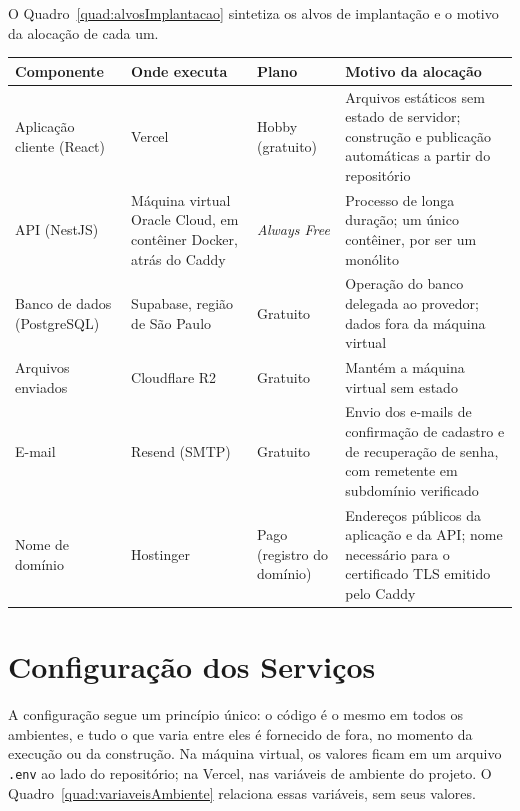 O Quadro~\ref{quad:alvosImplantacao} sintetiza os alvos de implantação e o motivo da alocação de cada um.

\FloatBarrier
\begin{quadro}[h!]
\caption{Alvos de implantação do sistema}
\label{quad:alvosImplantacao}
\footnotesize
\begin{tabular}{|p{2.4cm}|p{3.2cm}|p{2.0cm}|p{5.9cm}|}
\hline
\textbf{Componente} & \textbf{Onde executa} & \textbf{Plano} & \textbf{Motivo da alocação} \\ \hline
Aplicação cliente (React) & Vercel & Hobby (gratuito) & Arquivos estáticos sem estado de servidor; construção e publicação automáticas a partir do repositório \\ \hline
API (NestJS) & Máquina virtual Oracle Cloud, em contêiner Docker, atrás do Caddy & \textit{Always Free} & Processo de longa duração; um único contêiner, por ser um monólito \\ \hline
Banco de dados (PostgreSQL) & Supabase, região de São Paulo & Gratuito & Operação do banco delegada ao provedor; dados fora da máquina virtual \\ \hline
Arquivos enviados & Cloudflare R2 & Gratuito & Mantém a máquina virtual sem estado \\ \hline
E-mail & Resend (SMTP) & Gratuito & Envio dos e-mails de confirmação de cadastro e de recuperação de senha, com remetente em subdomínio verificado \\ \hline
Nome de domínio & Hostinger & Pago (registro do domínio) & Endereços públicos da aplicação e da API; nome necessário para o certificado TLS emitido pelo Caddy \\ \hline
\end{tabular}
\end{quadro}
\FloatBarrier

\section{Configuração dos Serviços}
\label{sec:configuracao_servicos}

A configuração segue um princípio único: o código é o mesmo em todos os ambientes, e tudo o que varia entre eles é fornecido de fora, no momento da execução ou da construção. Na máquina virtual, os valores ficam em um arquivo \texttt{.env} ao lado do repositório; na Vercel, nas variáveis de ambiente do projeto. O Quadro~\ref{quad:variaveisAmbiente} relaciona essas variáveis, sem seus valores.

